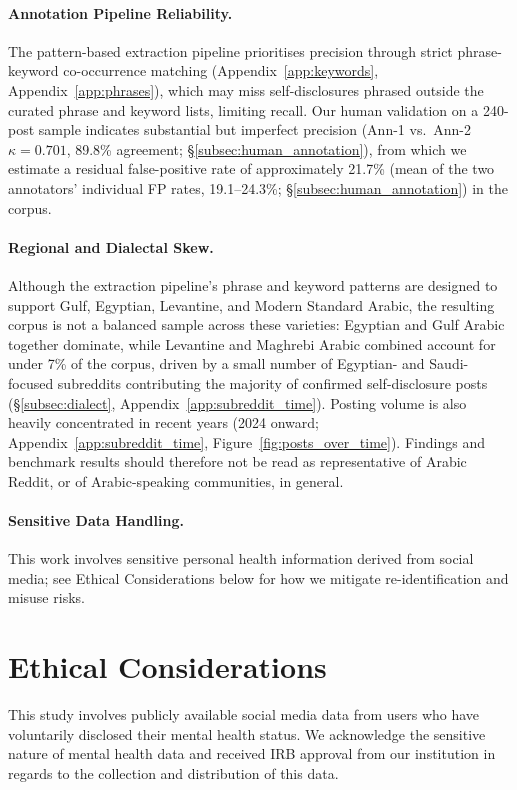 \documentclass[11pt]{article}
\begin{document}
\paragraph{Annotation Pipeline Reliability.}
The pattern-based extraction pipeline prioritises precision through strict phrase-keyword co-occurrence matching (Appendix~\ref{app:keywords}, Appendix~\ref{app:phrases}), which may miss self-disclosures phrased outside the curated phrase and keyword lists, limiting recall. Our human validation on a 240-post sample indicates substantial but imperfect precision (Ann-1 vs.\ Ann-2 $\kappa = 0.701$, 89.8\% agreement; §\ref{subsec:human_annotation}), from which we estimate a residual false-positive rate of approximately 21.7\% (mean of the two annotators' individual FP rates, 19.1--24.3\%; §\ref{subsec:human_annotation}) in the corpus.

\paragraph{Regional and Dialectal Skew.}
Although the extraction pipeline's phrase and keyword patterns are designed to support Gulf, Egyptian, Levantine, and Modern Standard Arabic, the resulting corpus is not a balanced sample across these varieties: Egyptian and Gulf Arabic together dominate, while Levantine and Maghrebi Arabic combined account for under 7\% of the corpus, driven by a small number of Egyptian- and Saudi-focused subreddits contributing the majority of confirmed self-disclosure posts (§\ref{subsec:dialect}, Appendix~\ref{app:subreddit_time}). Posting volume is also heavily concentrated in recent years (2024 onward; Appendix~\ref{app:subreddit_time}, Figure~\ref{fig:posts_over_time}). Findings and benchmark results should therefore not be read as representative of Arabic Reddit, or of Arabic-speaking communities, in general.

\paragraph{Sensitive Data Handling.}
\label{par:sensitive_data}
This work involves sensitive personal health information derived from social media; see Ethical Considerations below for how we mitigate re-identification and misuse risks.


\section*{Ethical Considerations}
\label{sec:ethics}
This study involves publicly available social media data from users who have voluntarily disclosed their mental health status. We acknowledge the sensitive nature of mental health data and received IRB approval from our institution in regards to the collection and distribution of this data. 
\end{document}
